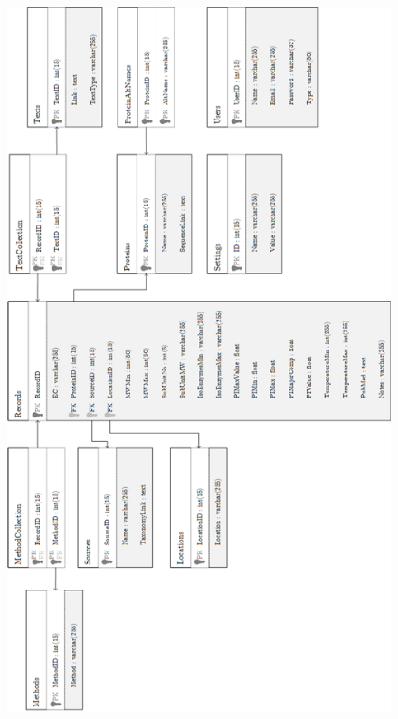 \begin{figure}[H]
  \centering
  \includegraphics{assets/uml-previous-fyp-database.png}
\end{figure}
